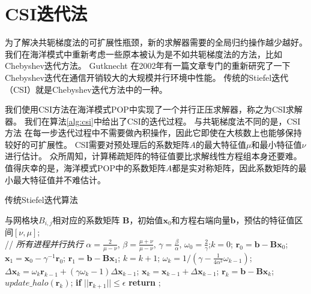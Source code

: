  
\section{CSI迭代法}
\label{solver:csi}

为了解决共轭梯度法的可扩展性瓶颈，新的求解器需要的全局归约操作越少越好。 
我们在海洋模式中重新考虑一些原本被认为是不如共轭梯度法的方法，比如Chebyshev迭代方法。 
Gutknecht \cite{gutknecht2002chebyshev} 在2002年有一篇文章专门的重新研究了一下Chebyshev迭代在通信开销较大的大规模并行环境中性能。 
传统的Stiefel迭代（CSI）就是Chebyshev迭代方法中的一种。 

我们使用CSI方法在海洋模式POP中实现了一个并行正压求解器，称之为CSI求解器。
我们在算法\ref{alg:csi}中给出了CSI的迭代过程。
与共轭梯度法不同的是，CSI方法 在每一步迭代过程中不需要做內积操作，因此它即使在大核数上也能够保持较好的可扩展性。
CSI需要对预处理后的系数矩阵$A$的最大特征值$\mu$和最小特征值$\nu$进行估计。 
众所周知，计算稀疏矩阵的特征值要比求解线性方程组本身还要难。 
值得庆幸的是，海洋模式POP中的系数矩阵$A$都是实对称矩阵，因此系数矩阵的最小最大特征值并不难估计。 
 
\begin{algorithm}[h]
\caption{传统Stiefel迭代算法}
\label{alg:csi}
\begin{algorithmic}[1]
\REQUIRE 与网格块$B_{i,j}$相对应的系数矩阵 $\textbf{B}$，初始值$\textbf{x}_0$和方程右端向量$\textbf{b}$，预估的特征值区间$[\nu,\mu]$;  \\
 // \qquad    \textit{所有进程并行执行}
\STATE $\alpha =\frac{2}{\mu -\nu}$, $ \beta = \frac{\mu +\nu}{\mu -\nu}$, $\gamma = \frac{\beta}{\alpha}$, $\omega_0 =\frac{ 2}{\gamma}$;\quad $k = 0$;
\STATE $\textbf{r}_0 = \textbf{b}-\textbf{B}\textbf{x}_0$; $\textbf{x}_1 =\textbf{x}_0 -\gamma^{-1}\textbf{r}_0$; $\textbf{r}_1 =\textbf{b} -\textbf{B}\textbf{x}_1$;
\STATE $k=k+1$;
\STATE $\omega_k = 1/(\gamma - \frac{1}{4\alpha^2}\omega_{k-1})$;  \label{AlgCsiIter}
\STATE $\Delta \textbf{x}_{k} =\omega_k\textbf{r}_{k-1}+(\gamma \omega_k-1)\Delta \textbf{x}_{k-1}$; \label{AlgCsiVec1}
\STATE $\textbf{x}_{k} =\textbf{x}_{k-1}+\Delta \textbf{x}_{k-1}$; \label{AlgCsiVec2}
\STATE $\textbf{r}_{k} =\textbf{b}- \textbf{B}\textbf{x}_{k}$;\label{AlgCsiVec3}
\STATE $update\_halo(\textbf{r}_k)$; \label{AlgCsiBound}
\STATE \textbf{if} $||\textbf{r}_{k+1}|| \le \epsilon$  \textbf{return} ;
\ENDIF\ENDWHILE
\end{algorithmic}
\end{algorithm}

